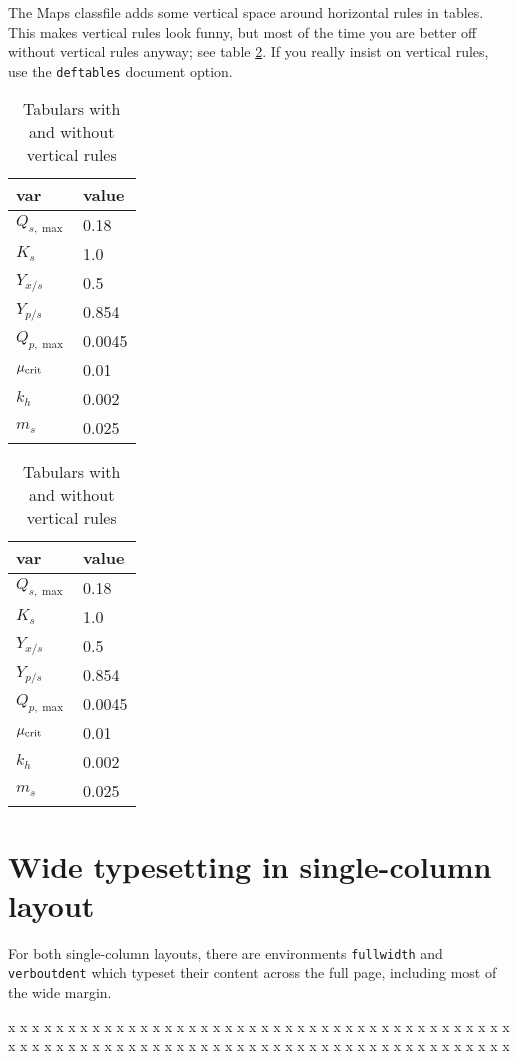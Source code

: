 \documentclass[nosubsub]{maps}
\begin{document}
The Maps classfile adds some vertical space around horizontal rules
in tables. This makes vertical rules look funny, but most of the
time you are better off without vertical rules anyway; see table
\ref{tabulars}. If you really insist on vertical rules, use the
\texttt{deftables} document option.

\begin{table}[ht]

\begin{tabular}{|l|l|}
\hline
var & value\\
\hline
$Q_{s,\max}$ & 0.18\\
$K_{s}$      & 1.0\\
$Y_{x/s}$    & 0.5\\
$Y_{p/s}$    & 0.854\\
$Q_{p,\max}$ & 0.0045\\
$\mu_{\rm crit}$  & 0.01\\
$k_{h}$       & 0.002\\
$m_{s}$       & 0.025\\
\hline
\end{tabular}\hspace{2pc}
\begin{tabular}{@{}ll@{}}
\hline
var & value\\
\hline
$Q_{s,\max}$   & 0.18\\
$K_{s}$        & 1.0\\
$Y_{x/s}$      & 0.5\\
$Y_{p/s}$      & 0.854\\
$Q_{p,\max}$   & 0.0045\\
$\mu_{\rm crit}$ & 0.01\\
$k_{h}$        & 0.002\\
$m_{s}$        & 0.025\\
\hline
\end{tabular}
\caption{Tabulars with and without vertical rules}\label{tabulars}
\end{table}

\section{Wide typesetting in single-column layout}

For both single-column layouts, there are environments \texttt{fullwidth} and
\texttt{verboutdent} which typeset their content across the full page,
including most of the wide margin.

\begin{fullwidth}
x x x x x x x x x x x x x x x x x x x x x
x x x x x x x x x x x x x x x x x x x x x
x x x x x x x x x x x x x x x x x x x x x
x x x x x x x x x x x x x x x x x x x x x
\end{fullwidth}
\end{document}
